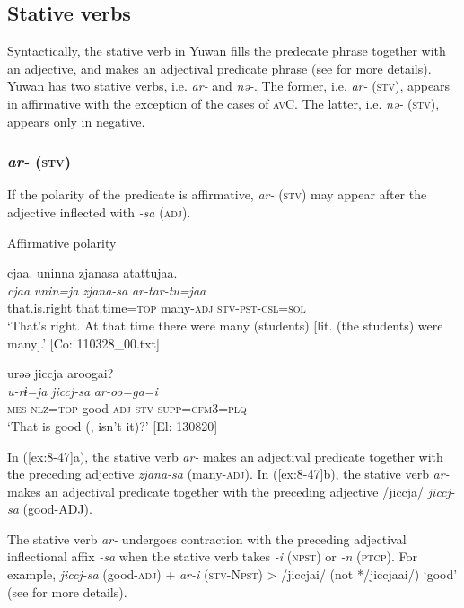 \subsection{Stative verbs}

Syntactically, the stative verb in Yuwan fills the predecate phrase together with an adjective, and makes an adjectival predicate phrase (see  for more details). Yuwan has two stative verbs, i.e. \textit{ar-} and \textit{nə-}. The former, i.e. \textit{ar-} (\textsc{stv}), appears in affirmative with the exception of the cases of \textsc{av}C. The latter, i.e. \textit{nə-} (\textsc{stv}), appears only in negative.

\subsubsection{\textit{ar-} (\textsc{stv})}

If the polarity of the predicate is affirmative, \textit{ar-} (\textsc{stv}) may appear after the adjective inflected with \textit{-sa} (\textsc{adj}).

\ea\label{ex:8-47}
  Affirmative polarity

\ea {\US}
\glll   cjaa.  uninna  zjanasa  atattujaa.\\
\textit{cjaa}  \textit{unin=ja}  \textit{zjana-sa}  \textit{ar-tar-tu=jaa}\\
that.is.right  that.time=\textsc{top}  many-\textsc{adj}  \textsc{stv}-\textsc{pst}-\textsc{csl}=\textsc{sol}\\
\glt ‘That’s right. At that time there were many (students) [lit. (the students) were many].’ [Co: 110328\_00.txt]

\ex
{\TM}
\glll  urəə  jiccja  aroogai?\\
\textit{u-rɨ=ja}  \textit{jiccj-sa}  \textit{ar-oo=ga=i}\\
\textsc{mes}-\textsc{nlz}=\textsc{top}  good-\textsc{adj}  \textsc{stv}-\textsc{supp}=\textsc{cfm3}=\textsc{plq}\\
\glt ‘That is good (, isn’t it)?’ [El: 130820]
\z
\z

In (\ref{ex:8-47}a), the stative verb \textit{ar-} makes an adjectival predicate together with the preceding adjective \textit{zjana-sa} (many-\textsc{adj}). In (\ref{ex:8-47}b), the stative verb \textit{ar-} makes an adjectival predicate together with the preceding adjective /jiccja/ \textit{jiccj-sa} (good-ADJ).

  The stative verb \textit{ar-} undergoes contraction with the preceding adjectival inflectional affix \textit{-sa} when the stative verb takes \textit{-i} (\textsc{npst}) or \textit{-n} (\textsc{ptcp}). For example, \textit{jiccj-sa} (good-\textsc{adj}) + \textit{ar-i} (\textsc{stv}-N\textsc{pst}) > /jiccjai/ (not */jiccjaai/) ‘good’ (see  for more details).

